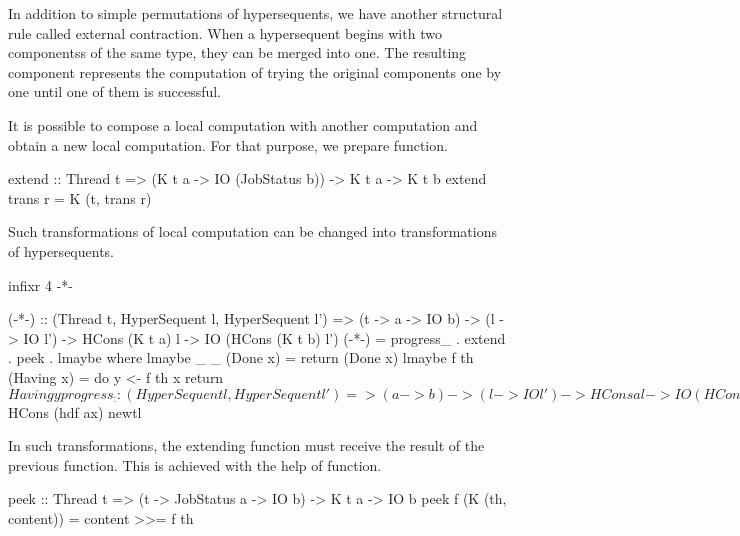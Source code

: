 In addition to simple permutations of hypersequents, we have another
structural rule called external contraction.  When a hypersequent begins
with two componentss of the same type, they can be merged into one.  The
resulting component represents the computation of trying the original
components one by one until one of them is successful.

It is possible to compose a local computation with another computation
and obtain a new local computation.
For that purpose, we prepare \verb@extend@ function.
\begin{code}
extend :: Thread t =>
  (K t a -> IO (JobStatus b)) -> K t a -> K t b
extend trans r = K (t, trans r)
\end{code}

Such transformations of local computation can be changed into
transformations of hypersequents.
\begin{code}
infixr 4 -*-

(-*-) :: (Thread t, HyperSequent l, HyperSequent l') =>
            (t -> a -> IO b) -> (l -> IO l') ->
            HCons (K t a) l -> IO (HCons (K t b) l')
(-*-) = progress_ . extend . peek . lmaybe
  where
    lmaybe _ _  (Done x) = return (Done x)
    lmaybe f th (Having x) =  do
      y <- f th x
      return $ Having y

progress_ :: (HyperSequent l, HyperSequent l') =>
            (a -> b) -> (l -> IO l') -> HCons a l ->
            IO (HCons b l')
progress_ hdf tlf (HCons ax bl) = do
  newtl <- tlf bl
  return $ HCons (hdf ax) newtl
\end{code}

In such transformations,
the extending function must receive the result of the previous function.
This is achieved with the help of \verb@peek@ function.
\begin{code}
peek :: Thread t =>
  (t -> JobStatus a -> IO b) -> K t a -> IO b
peek f (K (th, content)) = content >>= f th
\end{code}

